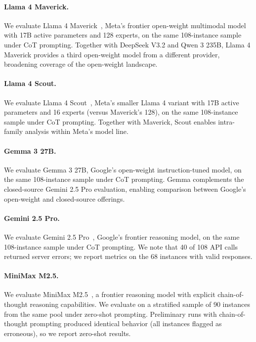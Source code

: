 \documentclass[11pt]{article}
\begin{document}
\paragraph{Llama 4 Maverick.}
We evaluate Llama 4 Maverick~\citep{meta2025llama4}, Meta's frontier open-weight multimodal model with 17B active parameters and 128 experts, on the same 108-instance sample under CoT prompting.
Together with DeepSeek V3.2 and Qwen 3 235B, Llama 4 Maverick provides a third open-weight model from a different provider, broadening coverage of the open-weight landscape.

\paragraph{Llama 4 Scout.}
We evaluate Llama 4 Scout~\citep{meta2025llama4}, Meta's smaller Llama 4 variant with 17B active parameters and 16 experts (versus Maverick's 128), on the same 108-instance sample under CoT prompting.
Together with Maverick, Scout enables intra-family analysis within Meta's model line.

\paragraph{Gemma 3 27B.}
We evaluate Gemma 3 27B, Google's open-weight instruction-tuned model, on the same 108-instance sample under CoT prompting.
Gemma complements the closed-source Gemini 2.5 Pro evaluation, enabling comparison between Google's open-weight and closed-source offerings.

\paragraph{Gemini 2.5 Pro.}
We evaluate Gemini 2.5 Pro~\citep{google2025gemini}, Google's frontier reasoning model, on the same 108-instance sample under CoT prompting.
We note that 40 of 108 API calls returned server errors; we report metrics on the 68 instances with valid responses.

\paragraph{MiniMax M2.5.}
We evaluate MiniMax M2.5~\citep{minimax2025}, a frontier reasoning model with explicit chain-of-thought reasoning capabilities.
We evaluate on a stratified sample of 90 instances from the same pool under zero-shot prompting.
Preliminary runs with chain-of-thought prompting produced identical behavior (all instances flagged as erroneous), so we report zero-shot results.
\end{document}
